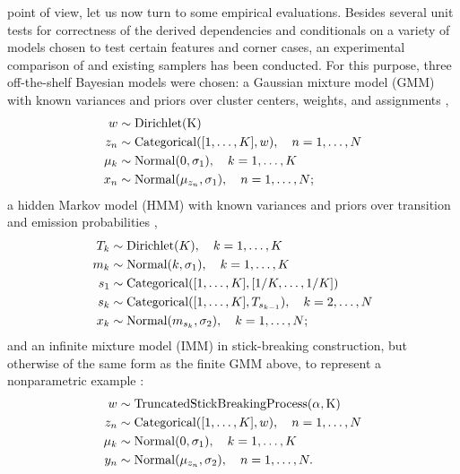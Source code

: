  point of view, let us now turn to some empirical evaluations.
Besides several unit tests for correctness of the derived dependencies and conditionals on a variety
of models chosen to test certain features and corner cases, an experimental comparison of
\autogibbsjl{} and existing \turingjl{} samplers has been conducted.  For this purpose, three
off-the-shelf Bayesian models were chosen: a Gaussian mixture model (GMM) with known variances and
priors over cluster centers, weights, and assignments \parencite[section 6.2]{marin2007bayesian},
\begin{equation}
  \label{eq:gmm}
  \begin{aligned}
    w &\sim \mathrm{Dirichlet(K)} \\
    z_{n} &\sim \mathrm{Categorical}([1, \ldots, K], w), \quad n = 1, \ldots, N \\
    \mu_{k} &\sim \mathrm{Normal}(0, \sigma_{1}), \quad k = 1, \ldots, K \\
    x_{n} &\sim \mathrm{Normal}(\mu_{z_{n}}, \sigma_{1}), \quad n = 1, \ldots, N;
  \end{aligned}
\end{equation}
a hidden Markov model (HMM) with known variances and priors over transition and emission
probabilities \parencite[section 7.3]{marin2007bayesian},
\begin{equation}
  \label{eq:hmm}
  \begin{aligned}
    T_{k} &\sim \mathrm{Dirichlet}(K), \quad k = 1, \ldots, K \\
    m_{k} &\sim \mathrm{Normal}(k, \sigma_{1}), \quad k = 1, \ldots, K \\
    s_{1} &\sim \mathrm{Categorical}([1, \ldots, K], [1/K, \ldots, 1/K]) \\
    s_{k} &\sim \mathrm{Categorical}([1, \ldots, K], T_{s_{k-1}}), \quad k = 2, \ldots, N \\
    x_{k} &\sim \mathrm{Normal}(m_{s_{k}}, \sigma_{2}), \quad k = 1, \ldots, N;
  \end{aligned}
\end{equation}
and an infinite mixture model (IMM) in stick-breaking construction, but otherwise of the same form
as the finite GMM above, to represent a nonparametric example \parencite[section
2.2]{hjort2010bayesian}:
\begin{equation}
  \label{eq:imm}
  \begin{aligned}
    w &\sim \mathrm{TruncatedStickBreakingProcess(\alpha, K)} \\
    z_{n} &\sim \mathrm{Categorical}([1, \ldots, K], w), \quad n = 1, \ldots, N \\
    \mu_{k} &\sim \mathrm{Normal}(0, \sigma_{1}), \quad k = 1, \ldots, K \\
    y_{n} &\sim \mathrm{Normal}(\mu_{z_{n}}, \sigma_{2}), \quad n = 1, \ldots, N.
  \end{aligned}
\end{equation}
